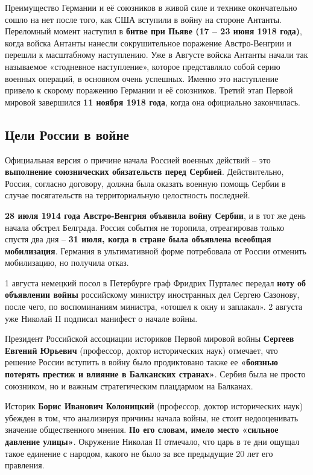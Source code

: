\documentclass{article}
\begin{document}
\hfill

Преимущество Германии и её союзников в живой силе и технике окончательно сошло на нет после того, как США вступили в войну на стороне Антанты. Переломный момент наступил в \textbf{битве при Пьяве (17 – 23 июня 1918 года)}, когда войска Антанты нанесли сокрушительное поражение Австро-Венгрии и перешли к масштабному наступлению. Уже в Августе войска Антанты начали так называемое «стодневное наступление», которое представляло собой серию военных операций, в основном очень успешных. Именно это наступление привело к скорому поражению Германии и её союзников. Третий этап Первой мировой завершился \textbf{11 ноября 1918 года}, когда она официально закончилась.

\pagebreak
\subsection{Цели России в войне}

Официальная версия о причине начала Россией военных действий – это \textbf{выполнение союзнических обязательств перед Сербией}. Действительно, Россия, согласно договору, должна была оказать военную помощь Сербии в случае посягательств на территориальную целостность последней. 

\textbf{28 июля 1914 года Австро-Венгрия объявила войну Сербии}, и в тот же день начала обстрел Белграда. Россия события не торопила, отреагировав только спустя два дня – \textbf{31 июля, когда в стране была объявлена всеобщая мобилизация}. Германия в ультимативной форме потребовала от России отменить мобилизацию, но получила отказ.

1 августа немецкий посол в Петербурге граф Фридрих Пурталес передал \textbf{ноту об объявлении войны} российскому министру иностранных дел Сергею Сазонову, после чего, по воспоминаниям министра, «отошел к окну и заплакал». 2 августа уже Николай II подписал манифест о начале войны.

\hfill

Президент Российской ассоциации историков Первой мировой войны \textbf{Сергеев Евгений Юрьевич} (профессор, доктор исторических наук) отмечает, что решение России вступить в войну было продиктовано также ее \textbf{«боязнью потерять престиж и влияние в Балканских странах»}. Сербия была не просто союзником, но и важным стратегическим плацдармом на Балканах. 

Историк \textbf{Борис Иванович Колоницкий} (профессор, доктор исторических наук) убежден в том, что анализируя причины начала войны, не стоит недооценивать значение общественного мнения. \textbf{По его словам, имело место «сильное давление улицы»}. Окружение Николая II отмечало, что царь в те дни ощущал такое единение с народом, какого не было за все предыдущие 20 лет его правления.
\end{document}
